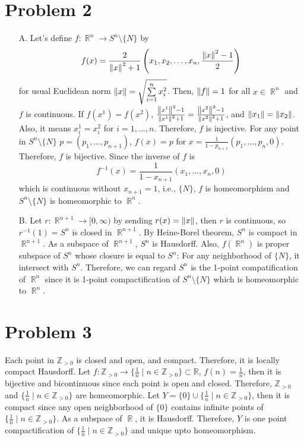 \documentclass{article}
\DeclareMathOperator{\rr}{\mathbb{R}}
\begin{document}
\section*{Problem 2}
\begin{enumerate}
\item[A.] Let's define $f:\rr^n\rightarrow S^{n}\setminus\{N\}$ by
\begin{equation*}
f(x)=\frac{2}{\norm{x}^2+1}\left(x_1, x_2, \ldots, x_n, \frac{\norm{x}^2-1}{2}\right)
\end{equation*}
for usual Euclidean norm $\norm{x}=\sqrt{\sum\limits_{i=1}^n x_i^2}$. Then, $\norm{f}=1$ for all $x\in \rr^n$ and $f$ is continuous. If $f(x^1)=f(x^2)$, $\frac{\norm{x^1}^2-1}{\norm{x^1}^2+1}=\frac{\norm{x^2}^2-1}{\norm{x^2}^2+1}$, and $\norm{x_1}=\norm{x_2}$. Also, it means $x^1_i=x^2_i$ for $i=1, \ldots, n$. Therefore, $f$ is injective. For any point in $S^n\setminus\{N\}$ $p=(p_1, \ldots, p_{n+1})$, $f(x)=p$ for $x=\frac{1}{1-p_{n+1}}(p_1, \ldots, p_n, 0)$. Therefore, $f$ is bijective. Since the inverse of $f$ is
\begin{equation*}
f^{-1}(x)=\frac{1}{1-x_{n+1}}(x_1, \ldots, x_n, 0)
\end{equation*}
which is continuous without $x_{n+1}=1$, i.e., $\{N\}$, $f$ is homeomorphism and $S^n\setminus\{N\}$ is homeomorphic to $\rr^n$.
\item[B.] Let $r:\rr^{n+1}\rightarrow [0, \infty)$ by sending $r(x)=\norm{x}$, then $r$ is continuous, so $r^{-1}(1)=S^{n}$ is closed in $\rr^{n+1}$. By Heine-Borel theorem, $S^n$ is compact in $\rr^{n+1}$. As a subspace of $\rr^{n+1}$, $S^n$ is Hausdorff. Also, $f(\rr^n)$ is proper subspace of $S^n$ whose closure is equal to $S^n$: For any neighborhood of $\{N\}$, it intersect with $S^n$. Therefore, we can regard $S^n$ is the 1-point compatification of $\rr^n$ since it is 1-point compactification of $S^n\setminus\{N\}$ which is homeomorphic to $\rr^n$.
\end{enumerate}
\section*{Problem 3}
Each point in $\mathbb{Z}_{>0}$ is closed and open, and compact. Therefore, it is locally compact Hausdorff. Let $f:\mathbb{Z}_{>0}\rightarrow \{\frac{1}{n} \mid n\in \mathbb{Z}_{>0}\}\subset \mathbb{R}$, $f(n)=\frac{1}{n}$, then it is bijective and bicontinuous since each point is open and closed. Therefore, $\mathbb{Z}_{>0}$ and $\{\frac{1}{n} \mid n\in \mathbb{Z}_{>0}\}$ are homeomorphic. Let $Y=\{0\}\cup \{\frac{1}{n} \mid n\in \mathbb{Z}_{>0}\}$, then it is compact since any open neighborhood of $\{0\}$ contains infinite points of $\{\frac{1}{n} \mid n\in \mathbb{Z}_{>0}\}$. As a subspace of $\rr$, it is Hausdorff. Therefore, $Y$ is one point compactification of $\{\frac{1}{n} \mid n\in \mathbb{Z}_{>0}\}$ and unique upto homeomorphism.
\end{document}
